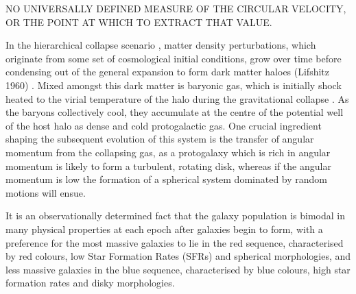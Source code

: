 \documentclass[a4paper,fleqn,usenatbib]{mn2e}
\begin{document}


NO UNIVERSALLY DEFINED MEASURE OF THE CIRCULAR VELOCITY, OR THE POINT AT WHICH TO EXTRACT THAT VALUE.

In the hierarchical collapse scenario \citep{Fall1980}, matter density perturbations, which originate from some set of cosmological initial conditions, grow over time before condensing out of the general expansion to form dark matter haloes (Lifshitz 1960) \cite{Silk1968,Peebles1970}.
Mixed amongst this dark matter is baryonic gas, which is initially shock heated to the virial temperature of the halo during the gravitational collapse \citep{Birnboim2003,Keres2005,Dekel2006}.
As the baryons collectively cool, they accumulate at the centre of the potential well of the host halo as dense and cold protogalactic gas.
One crucial ingredient shaping the subsequent evolution of this system is the transfer of angular momentum from the collapsing gas, as a protogalaxy which is rich in angular momentum is likely to form a turbulent, rotating disk, whereas if the angular momentum is low the formation of a spherical system dominated by random motions will ensue.

It is an observationally determined fact that the galaxy population is bimodal in many physical properties at each epoch after galaxies begin to form, with a preference for the most massive galaxies to lie in the red sequence, characterised by red colours, low Star Formation Rates (SFRs) and spherical morphologies, and less massive galaxies in the blue sequence, characterised by blue colours, high star formation rates and disky morphologies. 
\citep{Abramson2016,Abramson2016a}
\citep{Pannella2009a}
\end{document}
